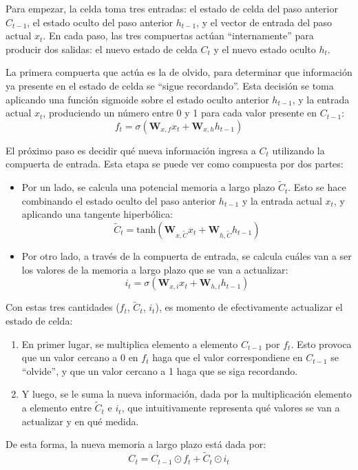 \documentclass[../../main.tex]{subfiles}
\begin{document}
Para empezar, la celda toma tres entradas: el estado de celda del paso anterior
\(C_{t-1}\), el estado oculto del paso anterior \(h_{t-1}\), y el vector de entrada del
paso actual \(x_t\). En cada paso, las tres compuertas actúan ``internamente'' para
producir dos salidas: el nuevo estado de celda \(C_t\) y el nuevo estado oculto \(h_t\).

La primera compuerta que actúa es la de olvido, para determinar que información ya
presente en el estado de celda se ``sigue recordando''. Esta decisión se toma aplicando
una función sigmoide sobre el estado oculto anterior \(h_{t-1}\), y la entrada actual
\(x_t\), produciendo un número entre 0 y 1 para cada valor presente en \(C_{t-1}\):
\[
    f_t = \sigma \left( \bm{W}_{x,f} x_t + \bm{W}_{x,h} h_{t-1}  \right)
\]

El próximo paso es decidir qué nueva información ingresa a \(C_t\) utilizando la compuerta
de entrada. Esta etapa se puede ver como compuesta por dos partes:
\begin{itemize}
    \item Por un lado, se calcula una potencial memoria a largo plazo \(\tilde{C}_t\).
    Esto se hace combinando el estado oculto del paso anterior \(h_{t-1}\) y la entrada
    actual \(x_t\), y aplicando una tangente hiperbólica:
    \[
        \tilde{C}_t = \text{tanh} \left( \bm{W}_{x, \tilde{C}} x_t + \bm{W}_{h, \tilde{C}} h_{t-1}  \right)
    \]
    \item Por otro lado, a través de la compuerta de entrada, se calcula cuáles
    van a ser los valores de la memoria a largo plazo que se van a actualizar:
    \[
        i_t = \sigma \left( \bm{W}_{x, i} x_t + \bm{W}_{h, i} h_{t-1}  \right)
    \]
\end{itemize}

Con estas tres cantidades (\(f_t\), \(\tilde{C}_t\), \(i_t\)), es momento de
efectivamente actualizar el estado de celda:
\begin{enumerate}
    \item En primer lugar, se multiplica elemento a elemento \(C_{t-1}\) por \(f_t\). Esto
    provoca que un valor cercano a 0 en \(f_t\) haga que el valor correspondiene en
    \(C_{t-1}\) se ``olvide'', y que un valor cercano a 1 haga que se siga recordando.
    \item Y luego, se le suma la nueva información, dada por la multiplicación
    elemento a elemento entre \(\tilde{C}_t\) e \(i_t\), que intuitivamente representa qué
    valores se van a actualizar y en qué medida.
\end{enumerate}
De esta forma, la nueva memoria a largo plazo está dada por:
\[
    C_t = C_{t-1} \odot f_t + \tilde{C}_t \odot i_t
\]
\end{document}
